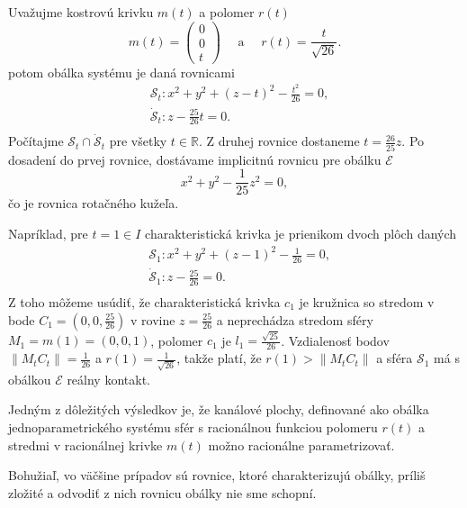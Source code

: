 \begin{example}
Uvažujme kostrovú krivku $m(t)$ a polomer $r(t)$
$$ 
m(t) = \begin{pmatrix} 0 \\ 0 \\ t \end{pmatrix} \quad \text{ a } \quad r(t) = \frac{t}{\sqrt{26}}.
$$
potom obálka systému je daná rovnicami
\begin{align*}
&\mathcal{S}_t \colon x^2 + y^2 + (z - t)^2 - \frac{t^2}{26} = 0, \\
&\mathcal{\dot{S}}_t \colon z - \frac{25}{26}t = 0. \\
\end{align*}
Počítajme $ \mathcal{S}_t \cap \mathcal{\dot{S}}_t $ pre všetky $t \in \mathbb{R}.$ Z druhej rovnice dostaneme $t = \frac{26}{25}z$. Po dosadení do prvej rovnice, dostávame implicitnú rovnicu pre obálku $\mathcal{E}$
$$
x^2 + y^2 - \frac{1}{25}z^2 = 0,
$$
čo je rovnica rotačného kužeľa.

Napríklad, pre $t = 1 \in I$ charakteristická krivka je prienikom dvoch plôch daných
\begin{align*}
&\mathcal{S}_1 \colon x^2 + y^2 + (z - 1)^2 - \frac{1}{26} = 0, \\
&\mathcal{\dot{S}}_1 \colon z - \frac{25}{26} = 0. \\
\end{align*}
Z toho môžeme usúdiť, že charakteristická krivka $c_1$ je kružnica so stredom v bode $C_1 = (0, 0, \frac{25}{26})$ v rovine $z = \frac{25}{26}$ a neprechádza stredom sféry $M_1 = m(1) = (0,0,1)$, polomer $c_1$ je $l_{1} = \frac{\sqrt{25}}{26}$. Vzdialenosť bodov $ \|M_tC_t\| = \frac{1}{26}$ a $r(1)= \frac{1}{\sqrt{26}}$, takže platí, že $r(1) > \|M_tC_t\|$ a sféra $\mathcal{S}_1$ má s obálkou $\mathcal{E}$ reálny kontakt.
\end{example}

Jedným z dôležitých výsledkov je, že kanálové plochy, definované ako obálka jednoparametrického systému sfér s racionálnou funkciou polomeru $r(t)$ a stredmi v racionálnej krivke $m(t)$ možno racionálne parametrizovať. \cite{Pet97}

Bohužiaľ, vo väčšine prípadov sú rovnice, ktoré charakterizujú obálky, príliš zložité a odvodiť z nich rovnicu obálky nie sme schopní.

